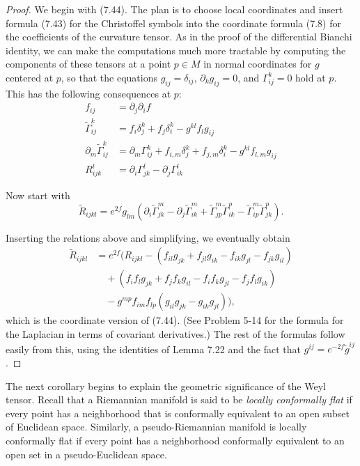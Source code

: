 \begin{proof}
We begin with (7.44). The plan is to choose local coordinates and insert formula (7.43) for the Christoffel symbols into the coordinate formula (7.8) for the coefficients of the curvature tensor. As in the proof of the differential Bianchi identity, we can make the computations much more tractable by computing the components of these tensors at a point $p \in M$ in normal coordinates for $g$ centered at $p$, so that the equations $g_{ij} = \delta_{ij}$, $\partial_k g_{ij} = 0$, and $\Gamma^k_{ij} = 0$ hold at $p$. This has the following consequences at $p$:
\begin{align*}
f_{ij} &= \partial_j \partial_i f \\
\tilde{\Gamma}^k_{ij} &= f_{i}\delta^k_j + f_j \delta^k_i - g^{kl} f_{l} g_{ij} \\
\partial_m \tilde{\Gamma}^k_{ij} &= \partial_m \Gamma^k_{ij} + f_{i,m}\delta^k_j + f_{j,m}\delta^k_i - g^{kl} f_{l,m} g_{ij} \\
R_{ijk}^l &= \partial_i \Gamma^l_{jk} - \partial_j \Gamma^l_{ik}
\end{align*}

Now start with
$$\tilde{R}_{ijkl} = e^{2f} g_{lm}(\partial_i \tilde{\Gamma}^m_{jk} - \partial_j \tilde{\Gamma}^m_{ik} + \tilde{\Gamma}^m_{jp} \tilde{\Gamma}^p_{ik} - \tilde{\Gamma}^m_{ip} \tilde{\Gamma}^p_{jk}).$$

Inserting the relations above and simplifying, we eventually obtain
\begin{align*}
\tilde{R}_{ijkl} &= e^{2f}(R_{ijkl} - (f_{il}g_{jk} + f_{jl}g_{ik} - f_{ik}g_{jl} - f_{jk}g_{il}) \\
&\quad + (f_i f_l g_{jk} + f_j f_k g_{il} - f_i f_k g_{jl} - f_j f_l g_{ik}) \\
&\quad - g^{mp} f_{im} f_{lp} (g_{il} g_{jk} - g_{ik} g_{jl})),
\end{align*}
which is the coordinate version of (7.44). (See Problem 5-14 for the formula for the Laplacian in terms of covariant derivatives.) The rest of the formulas follow easily from this, using the identities of Lemma 7.22 and the fact that $g^{ij} = e^{-2f}\tilde{g}^{ij}$.
\end{proof}

The next corollary begins to explain the geometric significance of the Weyl tensor. Recall that a Riemannian manifold is said to be \emph{locally conformally flat} if every point has a neighborhood that is conformally equivalent to an open subset of Euclidean space. Similarly, a pseudo-Riemannian manifold is locally conformally flat if every point has a neighborhood conformally equivalent to an open set in a pseudo-Euclidean space.

